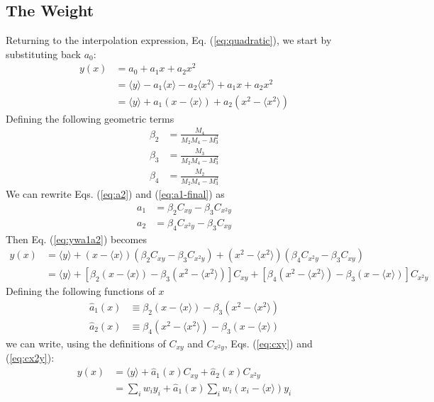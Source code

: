 \documentclass[oneside]{tufte-handout}
\begin{document}
\begin{fullwidth}
\subsection{The Weight}
Returning to the interpolation expression, Eq. (\ref{eq:quadratic}), we start by substituting back $a_0$:
\begin{align}
y(x) &= a_0 + a_1 x + a_2 x^2 \\
     &= \langle y \rangle - a_1 \langle x \rangle - a_2 \langle x^2 \rangle + a_1 x + a_2 x^2 \\
     &= \langle y \rangle + a_1 (x - \langle x \rangle) + a_2 (x^2 - \langle x^2 \rangle) \label{eq:ywa1a2}
\end{align}
Defining the following geometric terms
\begin{align}
\beta_2 &= \frac{M_4}{M_2 M_4 - M_3^2} \\
\beta_3 &= \frac{M_3}{M_2 M_4 - M_3^2}\\
\beta_4 &= \frac{M_2}{M_2 M_4 - M_3^2}
\end{align}
We can rewrite Eqs. (\ref{eq:a2}) and (\ref{eq:a1-final}) as
\begin{align}
a_1 &= \beta_2 C_{xy} - \beta_3 C_{x^2 y} \\
a_2 &= \beta_4 C_{x^2y} - \beta_3 C_{xy}
\end{align}
Then Eq. (\ref{eq:ywa1a2}) becomes
\begin{align}
y(x) &= \langle y \rangle + (x - \langle x \rangle)(\beta_2 C_{xy} - \beta_3 C_{x^2 y}) 
       + (x^2 - \langle x^2 \rangle)(\beta_4 C_{x^2y} - \beta_3 C_{xy}) \\
       &= \langle y \rangle  + [\beta_2(x - \langle x \rangle) - \beta_3 (x^2 - \langle x^2 \rangle)] C_{xy}
       + [\beta_4(x^2 - \langle x^2 \rangle) - \beta_3 (x - \langle x \rangle)] C_{x^2y}
\end{align}
Defining the following functions of $x$
\begin{align}
\hat{a}_1(x) &\equiv \beta_2(x - \langle x \rangle) - \beta_3 (x^2 - \langle x^2 \rangle) \\
\hat{a}_2(x) &\equiv \beta_4(x^2 - \langle x^2 \rangle) - \beta_3 (x - \langle x \rangle)
\end{align}
we can write, using the definitions of $C_{xy}$ and $C_{x^2y}$, Eqs. (\ref{eq:cxy}) and (\ref{eq:cx2y}):
\begin{align}
y(x) &= \langle y \rangle + \hat{a}_1(x) C_{xy} + \hat{a}_2(x) C_{x^2y} \\
     &= \sum_i w_i y_i + \hat{a}_1(x)  \sum_i w_i (x_i - \langle x \rangle) y_i 

\end{align}
\end{fullwidth}
\end{document}
